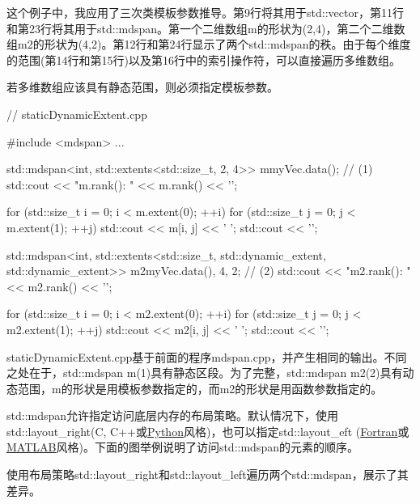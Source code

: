 这个例子中，我应用了三次类模板参数推导。第9行将其用于std::vector，第11行和第23行将其用于std::mdspan。第一个二维数组m的形状为(2,4)，第二个二维数组m2的形状为(4,2)。第12行和第24行显示了两个std::mdspan的秩。由于每个维度的范围(第14行和第15行)以及第16行中的索引操作符，可以直接遍历多维数组。


若多维数组应该具有静态范围，则必须指定模板参数。


\begin{cpp}
// staticDynamicExtent.cpp

#include <mdspan>
...

std::mdspan<int, std::extents<std::size_t, 2, 4>> m{myVec.data()}; // (1)
std::cout << "m.rank(): " << m.rank() << '\n';

for (std::size_t i = 0; i < m.extent(0); ++i) {
	for (std::size_t j = 0; j < m.extent(1); ++j) {
		std::cout << m[i, j] << ' ';
	}
	std::cout << '\n';
}

std::mdspan<int, std::extents<std::size_t, std::dynamic_extent, std::dynamic_extent>>
				m2{myVec.data(), 4, 2}; // (2)
std::cout << "m2.rank(): " << m2.rank() << '\n';

for (std::size_t i = 0; i < m2.extent(0); ++i) {
	for (std::size_t j = 0; j < m2.extent(1); ++j) {
		std::cout << m2[i, j] << ' ';
	}
	std::cout << '\n';
}
\end{cpp}

staticDynamicExtent.cpp基于前面的程序mdspan.cpp，并产生相同的输出。不同之处在于，std::mdspan m(1)具有静态区段。为了完整，std::mdspan m2(2)具有动态范围，m的形状是用模板参数指定的，而m2的形状是用函数参数指定的。

std::mdspan允许指定访问底层内存的布局策略。默认情况下，使用std::layout\_right(C, C++或\href{https://en.wikipedia.org/wiki/Python_(programming_language)}{Python}风格)，也可以指定std::layout\_eft (\href{https://en.wikipedia.org/wiki/Fortran}{Fortran}或\href{https://en.wikipedia.org/wiki/MATLAB}{MATLAB}风格)。下面的图举例说明了访问std::mdspan的元素的顺序。


使用布局策略std::layout\_right和std::layout\_left遍历两个std::mdspan，展示了其差异。


